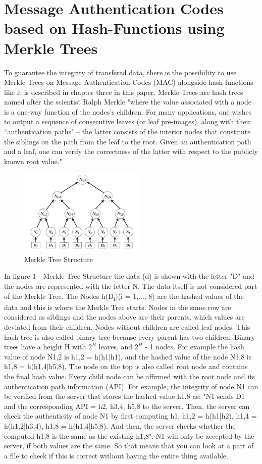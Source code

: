 \section{Message Authentication Codes based on Hash-Functions using Merkle Trees}

To guarantee the integrity of transfered data, there is the possibility to use Merkle Trees on Message Authentication Codes (MAC) alongside hash-functions like it is described in chapter three in this paper. Merkle Trees are hash trees named after the scientist Ralph Merkle "where the value associated with a node is a one-way function of the nodes’s children. For many applications, one wishes to output a sequence of consecutive leaves (or leaf pre-images), along with their “authentication paths" – the latter consists of the interior nodes that constitute the siblings on the path from the leaf to the root. Given an authentication path and a leaf, one can verify the correctness of the latter with respect to the publicly known root value." \cite{MT} 

\begin{figure}
\centering
\includegraphics[width=6cm]{Pages/Merkle/merkleTree.png}
\caption{Merkle Tree Structure \cite{METR}}
\end{figure}

In figure 1 - Merkle Tree Structure the data (d) is shown with the letter "D" and the nodes are represented with the letter N. The data itself is not considered part of the Merkle Tree. The Nodes h(D\textsubscript{i})(i = 1,..., 8) are the hashed values of the data and this is where the Merkle Tree starts. Nodes in the same row are considered as siblings and the nodes above are their parents, which values are deviated from their children. Nodes without children are called leaf nodes. This hash tree is also called binary tree because every parent has two children. Binary trees have a height H with $ 2^{H} $ leaves, and $  2^{H} $ - 1 nodes. \cite{MT} 
For example the hash value of node N1,2 is h1,2 = h(h1|h1), and the hashed value of the node N1,8 is h1,8 = h(h1,4|h5,8). \cite{METR} The node on the top is also called root node and contains the final hash value. Every child node can be affirmed with the root node and its authentication path information (API). For example, the integrity of node N1 can be verified from the server that stores the hashed value h1,8 as: "N1 sends D1 and the corresponding API = h2, h3,4, h5,8 to the server. Then, the server can check the authenticity of node N1 by first computing h1, h1,2 = h(h1|h2), h1,4 = h(h1,2|h3,4), h1,8 = h(h1,4|h5,8). And then, the server checks whether the computed h1,8 is the same as the existing h1,8". \cite{METR} N1 will only be accepted by the server, if both values are the same. So that means that you can look at a part of a file to check if this is correct without having the entire thing available.

